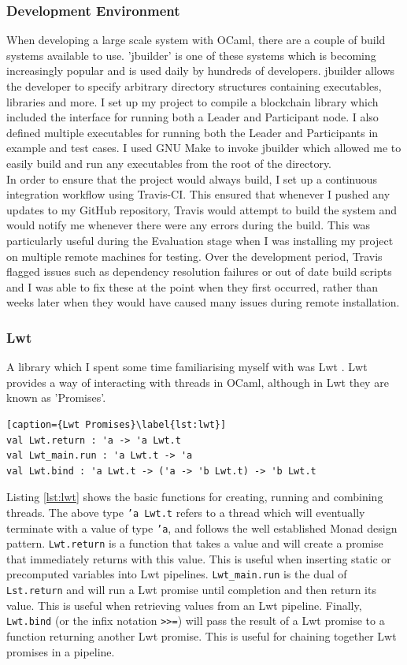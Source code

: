 \documentclass[12pt,a4paper,twoside,openright]{report}
\begin{document}
		\subsubsection*{Development Environment}
		When developing a large scale system with OCaml, there are a couple of build systems available to use. 
		'jbuilder' \cite{jbuilder} is one of these systems which is becoming increasingly popular and is used daily by hundreds of developers.
		jbuilder allows the developer to specify arbitrary directory structures containing executables, libraries and more.
		I set up my project to compile a blockchain library which included the interface for running both a Leader and Participant node. 
		I also defined multiple executables for running both the Leader and Participants in example and test cases. 
		I used GNU Make \cite{GNUMake} to invoke jbuilder which allowed me to easily build and run any executables from the root of the directory.\\
		
		In order to ensure that the project would always build, I set up a continuous integration workflow using Travis-CI. 
		This ensured that whenever I pushed any updates to my GitHub repository, Travis would attempt to build the system and would notify me whenever there were any errors during the build.
		This was particularly useful during the Evaluation stage when I was installing my project on multiple remote machines for testing.
		Over the development period, Travis flagged issues such as dependency resolution failures or out of date build scripts and I was able to fix these at the point when they first occurred, rather than weeks later when they would have caused many issues during remote installation.

	\subsubsection*{Lwt}
		A library which I spent some time familiarising myself with was Lwt \cite{Lwt}. 
		Lwt provides a way of interacting with threads in OCaml, although in Lwt they are known as 'Promises'.
		\begin{lstlisting}[caption={Lwt Promises}\label{lst:lwt}]
val Lwt.return : 'a -> 'a Lwt.t 
val Lwt_main.run : 'a Lwt.t -> 'a
val Lwt.bind : 'a Lwt.t -> ('a -> 'b Lwt.t) -> 'b Lwt.t
		\end{lstlisting}
		Listing \ref{lst:lwt} shows the basic functions for creating, running and combining threads.
		The above type \texttt{'a Lwt.t} refers to a thread which will eventually terminate with a value of type \texttt{'a}, and follows the well established Monad design pattern.
		\texttt{Lwt.return} is a function that takes a value and will create a promise that immediately returns with this value.
		This is useful when inserting static or precomputed variables into Lwt pipelines.
		\texttt{Lwt\_main.run} is the dual of \texttt{Lst.return} and will run a Lwt promise until completion and then return its value.
		This is useful when retrieving values from an Lwt pipeline.
		Finally, \texttt{Lwt.bind} (or the infix notation \texttt{>>=}) will pass the result of a Lwt promise to a function returning another Lwt promise.
		This is useful for chaining together Lwt promises in a pipeline.
\end{document}
